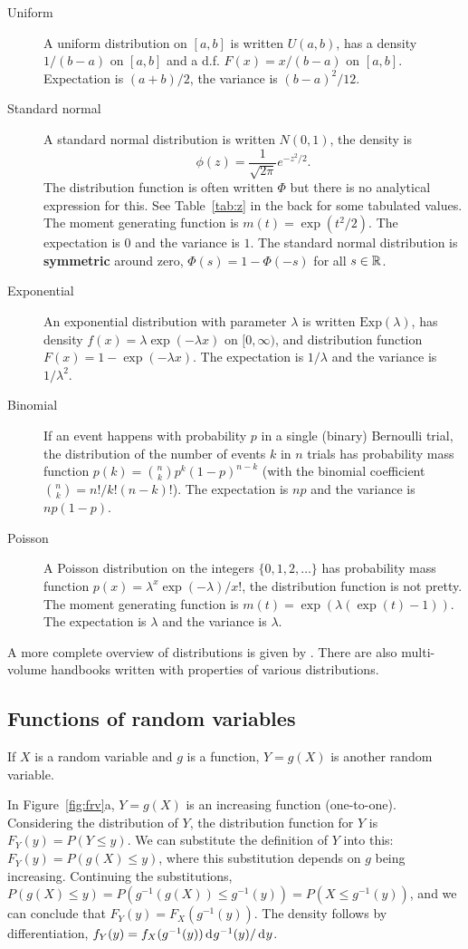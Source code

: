 \documentclass[10pt]{article}
\begin{document}
\begin{description}
\item[Uniform] A uniform distribution on $[a,b]$ is written $U(a,b)$, has a density $1/(b-a)$ on $[a,b]$ and 
a d.f. $F(x)=x/(b-a)$ on $[a,b]$. Expectation is $(a+b)/2$, the variance is $(b-a)^2/12$. 
\item[Standard normal] A standard normal distribution is written $N(0,1)$,  the density is 
\[ \phi(z) = \frac{1}{\sqrt{2\pi}} e^{-z^2/2}.\] The distribution function is often written $\Phi$ but
there is no analytical expression for this. See Table~\ref{tab:z} in the back for some tabulated values.
The moment generating function is $m(t) = \exp(t^2/2)$. The expectation is $0$ and the variance is $1$. The 
standard normal distribution is \textbf{symmetric} around zero, $\Phi(s)=1-\Phi(-s)$ for all $s\in\mathbb{R}$.
\item[Exponential] An exponential distribution with parameter $\lambda$ is written $\mathrm{Exp}(\lambda)$, 
has density $f(x)=\lambda \exp(-\lambda  x)$ on $[0,\infty)$, and distribution function $F(x)=1- \exp(-\lambda x)$.
The expectation is $1/\lambda$ and the variance is $1/\lambda^2$.
\item[Binomial] If an event happens with probability $p$ in a single (binary)
Bernoulli trial, the distribution of the number of events $k$ in $n$ trials has
probability mass function $p(k) = \binom{n}{k} p^k (1-p)^{n-k}$ (with the
binomial coefficient $\binom{n}{k} = n!/k!(n-k)!$). The expectation is $n p$ and the variance is $n p(1-p)$.
\item[Poisson] A Poisson distribution on the integers $\{0,1,2,\dots\}$ has probability mass function 
$p(x) = \lambda^x \exp(-\lambda)/x!$, the distribution function is not pretty. The moment generating function
is $m(t) = \exp(\lambda( \exp(t) -1))$. The expectation is $\lambda$ and the variance is $\lambda$.
\end{description}

A more complete overview of distributions is given by \citet{Leemis2008}. There are also multi-volume
handbooks written with properties of various distributions. 

\subsection{Functions of random variables}
If $X$ is a random variable and $g$ is a function, $Y=g(X)$ is another random variable.

In Figure~\ref{fig:frv}a, $Y=g(X)$ is an increasing function (one-to-one). 
Considering the distribution of $Y$, 
the distribution function for $Y$ is $F_Y(y) = P(Y\leq y)$. We can substitute
the definition of $Y$ into this: $F_Y(y) = P(g(X)\leq y)$, where this
substitution depends on $g$ being increasing. Continuing
the substitutions, $P(g(X) \leq y) = P( g^{-1}(g(X)) \leq g^{-1}(y)) = P(X\leq g^{-1}(y))$,
and we can conclude that $F_Y(y)= F_X(g^{-1}(y))$. The density follows by differentiation, 
$f_Y(y) = f_X(g^{-1}(y)) \rd g^{-1}(y)/\rd y$.
\end{document}
